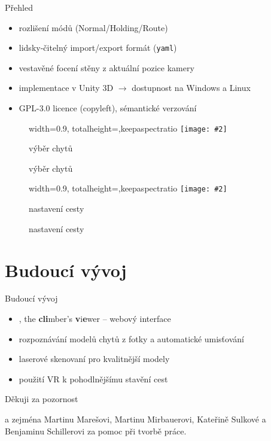 \documentclass[czech]{beamer}
\makeatletter
\newcommand{\fitimage}[2][\@nil]{
	\begin{figure}
		\begin{adjustbox}{width=0.9\textwidth, totalheight=\textheight-2\baselineskip-2\baselineskip,keepaspectratio}
			\texttt{[image: \#2]}
		\end{adjustbox}
		\def\tmp{#1}%
	 \ifx\tmp\@nnil
			\else
			\caption*{#1}
		\fi
	\end{figure}
}
\makeatother
\begin{document}
	\begin{frame}{Přehled}
		\begin{itemize}
			\item rozlišení módů (Normal/Holding/Route)
			\item lidsky-čitelný import/export formát (\texttt{yaml})
			\item vestavěné focení stěny z aktuální pozice kamery
			\vspace{0.7em}
			\item implementace v Unity 3D \(\rightarrow\) dostupnost na Windows a Linux
			\item GPL-3.0 licence (copyleft), sémantické verzování
		\end{itemize}

		\begin{minipage}[t]{0.5\textwidth}
			\fitimage[\centering výběr chytů]{images/picker.jpg}
		\end{minipage}%
		\hfill
		\begin{minipage}[t]{0.5\textwidth}
			\fitimage[\centering nastavení cesty]{images/settings.jpg}
		\end{minipage}
	\end{frame}

	\section{Budoucí vývoj}

	\begin{frame}{Budoucí vývoj}
		\begin{itemize}
			\item \raisebox{-0.07em}{}, the \textbf{cli}mber's \textbf{v}i\textbf{e}wer -- webový interface
			\item rozpoznávání modelů chytů z fotky a automatické umisťování
			\item laserové skenovaní pro kvalitnější modely
			\item použití VR k pohodlnějšímu stavění cest
		\end{itemize}
	\end{frame}

	\begin{frame}[focus]
		Děkuji za pozornost
		\vspace{0.5em}

		\normalsize\normalfont a zejména Martinu Marešovi, Martinu Mirbauerovi, Kateřině Sulkové a Benjaminu Schillerovi za pomoc při tvorbě práce.
	\end{frame}
\end{document}
